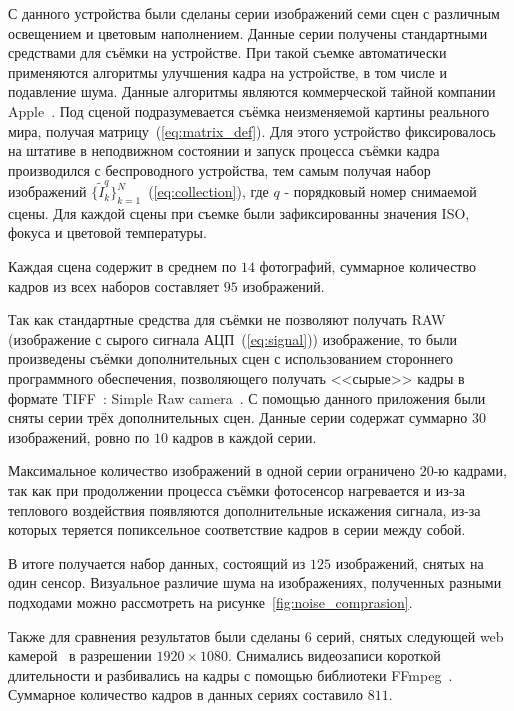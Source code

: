 С данного устройства были сделаны серии изображений семи сцен с различным освещением и цветовым наполнением. Данные серии получены стандартными средствами для съёмки на устройстве. При такой съемке автоматически применяются алгоритмы улучшения кадра на устройстве, в том числе и подавление шума. Данные алгоритмы являются коммерческой тайной компании Apple~\autocite{APPLElink}. Под сценой подразумевается съёмка неизменяемой картины реального мира, получая матрицу~(\ref{eq:matrix_def}). Для этого устройство фиксировалось на штативе в неподвижном состоянии  и запуск процесса съёмки кадра производился  с беспроводного устройства, тем самым получая набор изображений $\{\tilde{I}^q_k\}_{k=1}^{N}$~(\ref{eq:collection}), где $q$ - порядковый номер снимаемой сцены. Для каждой сцены при съемке были зафиксированны значения ISO, фокуса и цветовой температуры. 

Каждая сцена содержит в среднем по $14$ фотографий, суммарное количество кадров из всех наборов составляет $95$ изображений.


Так как стандартные средства для съёмки не позволяют получать RAW (изображение с сырого сигнала АЦП~(\ref{eq:signal})) изображение, то были произведены съёмки дополнительных сцен с использованием стороннего программного обеспечения, позволяющего получать <<сырые>>  кадры в формате TIFF~\autocite{TIFFArticle}: Simple Raw camera~\autocite{RAWCamera}. С помощью данного приложения были сняты серии трёх дополнительных сцен. Данные серии содержат суммарно $30$ изображений, ровно по $10$ кадров в каждой серии.

Максимальное количество изображений в одной серии ограничено $20$-ю кадрами, так как при продолжении процесса съёмки фотосенсор нагревается и из-за теплового воздействия появляются дополнительные искажения сигнала, из-за которых теряется попиксельное соответствие кадров в серии между собой.

В итоге получается набор данных, состоящий из $125$ изображений, снятых на один сенсор. Визуальное различие шума на изображениях, полученных разными подходами можно рассмотреть на рисунке~\ref{fig:noise_comprasion}.

Также для сравнения результатов были сделаны 6 серий, снятых следующей web камерой~\autocite{WebCam} в разрешении $1920\times1080$. Снимались видеозаписи короткой длительности и разбивались на кадры с помощью библиотеки FFmpeg~\autocite{FFMPEG}. Суммарное количество кадров в данных сериях составило $811$.


